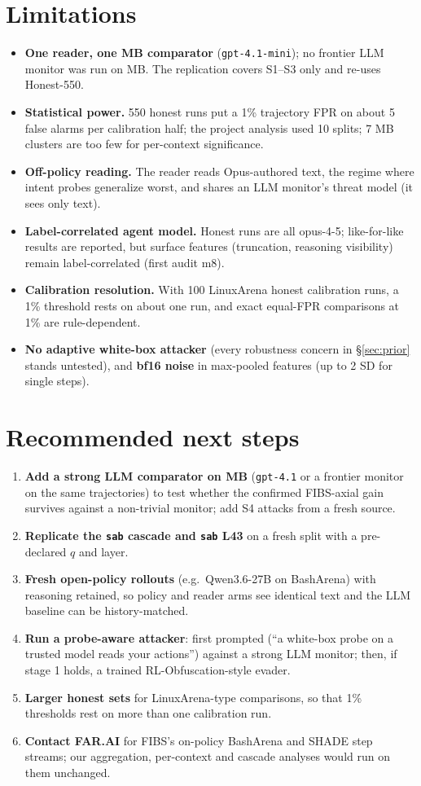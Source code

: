 \documentclass[11pt]{article}
\begin{document}
\section{Limitations}
\begin{itemize}
\item \textbf{One reader, one MB comparator} (\texttt{gpt-4.1-mini}); no frontier LLM monitor was run on MB. The replication covers S1--S3 only and re-uses Honest-550.
\item \textbf{Statistical power.} 550 honest runs put a 1\% trajectory FPR on about 5 false alarms per calibration half; the project analysis used 10 splits; 7 MB clusters are too few for per-context significance.
\item \textbf{Off-policy reading.} The reader reads Opus-authored text, the regime where intent probes generalize worst, and shares an LLM monitor's threat model (it sees only text).
\item \textbf{Label-correlated agent model.} Honest runs are all opus-4-5; like-for-like results are reported, but surface features (truncation, reasoning visibility) remain label-correlated (first audit m8).
\item \textbf{Calibration resolution.} With 100 LinuxArena honest calibration runs, a 1\% threshold rests on about one run, and exact equal-FPR comparisons at 1\% are rule-dependent.
\item \textbf{No adaptive white-box attacker} (every robustness concern in \S\ref{sec:prior} stands untested), and \textbf{bf16 noise} in max-pooled features (up to 2 SD for single steps).
\end{itemize}

\section{Recommended next steps}
\begin{enumerate}
\item \textbf{Add a strong LLM comparator on MB} (\texttt{gpt-4.1} or a frontier monitor on the same trajectories) to test whether the confirmed FIBS-axial gain survives against a non-trivial monitor; add S4 attacks from a fresh source.
\item \textbf{Replicate the \texttt{sab} cascade and \texttt{sab} L43} on a fresh split with a pre-declared $q$ and layer.
\item \textbf{Fresh open-policy rollouts} (e.g.\ Qwen3.6-27B on BashArena) with reasoning retained, so policy and reader arms see identical text and the LLM baseline can be history-matched.
\item \textbf{Run a probe-aware attacker}: first prompted (``a white-box probe on a trusted model reads your actions'') against a strong LLM monitor; then, if stage 1 holds, a trained RL-Obfuscation-style evader.
\item \textbf{Larger honest sets} for LinuxArena-type comparisons, so that 1\% thresholds rest on more than one calibration run.
\item \textbf{Contact FAR.AI} for FIBS's on-policy BashArena and SHADE step streams; our aggregation, per-context and cascade analyses would run on them unchanged.
\end{enumerate}
\end{document}
